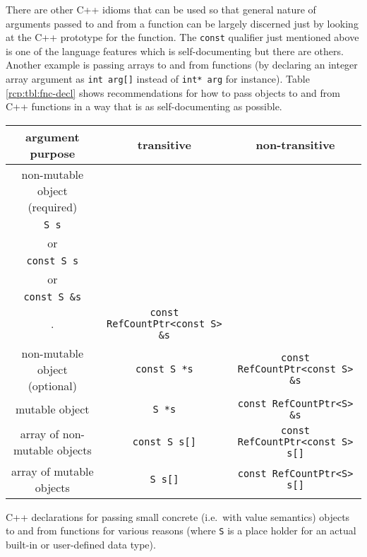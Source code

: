 There are other C++ idioms that can be used so that general nature of
arguments passed to and from a function can be largely discerned just
by looking at the C++ prototype for the function.  The
{}\texttt{const} qualifier just mentioned above is one of the language
features which is self-documenting but there are others.  Another
example is passing arrays to and from functions (by declaring an
integer array argument as {}\texttt{int arg[]} instead of
{}\texttt{int* arg} for instance).  Table {}\ref{rcp:tbl:fnc-decl}
shows recommendations for how to pass objects to and from C++
functions in a way that is as self-documenting as possible.

\begin{table}
%
\begin{minipage}{{}\textwidth}
\begin{tabular}{|c|c|c|}
\hline
argument purpose
& transitive
& non-transitive \\
\hline
non-mutable object (required)
& \begin{minipage}{12ex}
    \begin{center}
    {\tiny .}\\
    {}\texttt{S s} \\
    or \\
    {}\texttt{const S s} \\
    or \\
    {}\texttt{const S \&s} \\
    {\tiny .}
    \end{center}
  \end{minipage}
& {}\texttt{const RefCountPtr<const S> \&s} \\
\hline
non-mutable object (optional)
& {}\texttt{const S *s}
& {}\texttt{const RefCountPtr<const S> \&s} \\
\hline
mutable object
& {}\texttt{S *s}
& {}\texttt{const RefCountPtr<S> \&s} \\
\hline
array of non-mutable objects
& {}\texttt{const S s[]}
& {}\texttt{const RefCountPtr<const S> s[]} \\
\hline
array of mutable objects
& {}\texttt{S s[]}
& {}\texttt{const RefCountPtr<S> s[]} \\
\hline
\end{tabular}
\begin{center}
C++ declarations for passing small concrete (i.e.~with value
semantics) objects to and from functions for various reasons (where
{}\texttt{S} is a place holder for an actual built-in or user-defined
data type).
\end{center}

\end{minipage}
\end{table}
